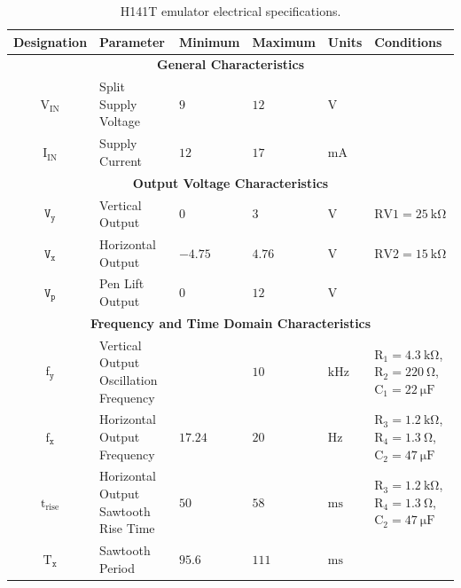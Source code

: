 \documentclass[class=report,11pt,crop=false]{standalone}
\begin{document}
	\begin{table}[ht!]
		\caption{H141T emulator electrical specifications.}
		\label{tab:vertical-output-emulator-ct-specifications}
		\centering
		\begin{tabular}{|cm{10em}m{5em}m{5em}m{5em}m{8em}|}
			\hline
			\cellcolor{cyan!25}\textbf{Designation} & \cellcolor{cyan!25}\textbf{Parameter} &	\cellcolor{cyan!25}\textbf{Minimum} &  \cellcolor{cyan!25}\textbf{Maximum}	& \cellcolor{cyan!25}\textbf{Units} & \cellcolor{cyan!25}\textbf{Conditions}\\
			\hline
			\multicolumn{6}{c}{\textbf{General Characteristics}}\\
			\hline
			$\text{V}_{\text{IN}}$ & Split Supply Voltage  & $9$ & $12$ & $\si{\volt}$ & \\
			\hline
			$\text{I}_{\text{IN}}$ & Supply Current  & $12$ & $17$ & $\si{\milli\ampere}$ & \\
			\hline
			\multicolumn{6}{c}{\textbf{Output Voltage Characteristics}}\\
			\hline
			$\texttt{V}_\texttt{y}$	& Vertical Output	&	$0$	&	$3$ & $\si{\volt}$ & $\text{RV1} = \SI{25}{\kilo\ohm}$ \\
			\hline
			$\texttt{V}_\texttt{x}$	& Horizontal Output	&	$-4.75$	&	$4.76$ & $\si{\volt}$ & $\text{RV2} = \SI{15}{\kilo\ohm}$\\
			\hline
			$\texttt{V}_\texttt{p}$	& Pen Lift Output	&   $0$	& 	$12$ & $\si{\volt}$ & \\
			\hline
			\multicolumn{6}{c}{\textbf{Frequency and Time Domain Characteristics}}\\
			\hline
			$\text{f}_\texttt{y}$	& Vertical Output Oscillation Frequency	&	&	$10$ & $\si{\kilo\hertz}$ & $\text{R}_1 = \SI{4.3}{\kilo\ohm}$, $\text{R}_2 = \SI{220}{\ohm}$, $\text{C}_1 = \SI{22}{\micro\farad}$ \\
			\hline
			$\text{f}_\texttt{x}$	& Horizontal Output Frequency	& $17.24$ 	& $20$ & $\si{\hertz}$ & $\text{R}_3 = \SI{1.2}{\kilo\ohm}$, $\text{R}_4 = \SI{1.3}{\ohm}$, $\text{C}_2 = \SI{47}{\micro\farad}$\\
			\hline
			$\text{t}_\text{rise}$				& Horizontal Output Sawtooth Rise Time	& $50$	&	$58$ &	$\si{\milli\second}$	&	$\text{R}_3 = \SI{1.2}{\kilo\ohm}$, $\text{R}_4 = \SI{1.3}{\ohm}$, $\text{C}_2 = \SI{47}{\micro\farad}$\\
			\hline
			$\text{T}_\texttt{x}$	&	Sawtooth Period	& $95.6$	& $111$	& $\si{\milli\second}$	& \\
			\hline
		\end{tabular}
	\end{table}
\end{document}
